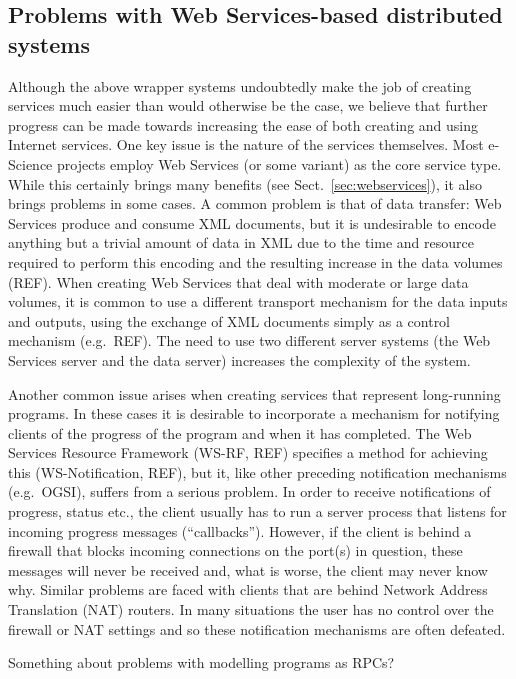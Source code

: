 \documentclass{llncs}
\begin{document}
\subsection{Problems with Web Services-based distributed systems}
Although the above wrapper systems undoubtedly make the job of creating services much easier than would otherwise be the case, we believe that further progress can be made towards increasing the ease of both creating and using Internet services.  One key issue is the nature of the services themselves.  Most e-Science projects employ Web Services (or some variant) as the core service type.  While this certainly brings many benefits (see Sect.~\ref{sec:webservices}), it also brings problems in some cases.  A common problem is that of data transfer: Web Services produce and consume XML documents, but it is undesirable to encode anything but a trivial amount of data in XML due to the time and resource required to perform this encoding and the resulting increase in the data volumes (REF).  When creating Web Services that deal with moderate or large data volumes, it is common to use a different transport mechanism for the data inputs and outputs, using the exchange of XML documents simply as a control mechanism (e.g.\ REF).  The need to use two different server systems (the Web Services server and the data server) increases the complexity of the system.

Another common issue arises when creating services that represent long-running programs.  In these cases it is desirable to incorporate a mechanism for notifying clients of the progress of the program and when it has completed.  The Web Services Resource Framework (WS-RF, REF) specifies a method for achieving this (WS-Notification, REF), but it, like other preceding notification mechanisms (e.g.\ OGSI), suffers from a serious problem.  In order to receive notifications of progress, status etc., the client usually has to run a server process that listens for incoming progress messages (``callbacks'').  However, if the client is behind a firewall that blocks incoming connections on the port(s) in question, these messages will never be received and, what is worse, the client may never know why.  Similar problems are faced with clients that are behind Network Address Translation (NAT) routers.  In many situations the user has no control over the firewall or NAT settings and so these notification mechanisms are often defeated.

Something about problems with modelling programs as RPCs?
\end{document}
